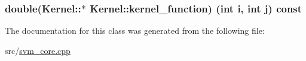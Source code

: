 \subsubsection[{kernel\+\_\+function}]{\setlength{\rightskip}{0pt plus 5cm}double(Kernel\+::$\ast$ Kernel\+::kernel\+\_\+function) (int i, int j) const \hspace{0.3cm}{\ttfamily [protected]}}\hypertarget{classKernel_ac7b39305896e51f9e1a08e026e2c4d9c}{}\label{classKernel_ac7b39305896e51f9e1a08e026e2c4d9c}


The documentation for this class was generated from the following file\+:\begin{DoxyCompactItemize}
\item 
src/\hyperlink{svm__core_8cpp}{svm\+\_\+core.\+cpp}\end{DoxyCompactItemize}
